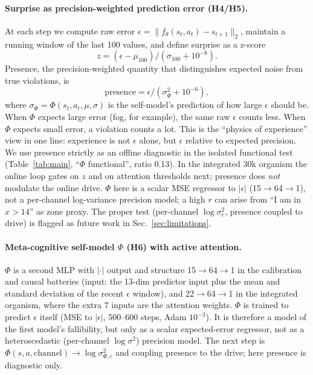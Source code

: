 \documentclass[11pt,a4paper]{article}
\begin{document}
\paragraph{Surprise as precision-weighted prediction error (H4/H5).} At each step we compute raw error $\epsilon = \|f_\theta(s_t,a_t) - s_{t+1}\|_2$, maintain a running window of the last 100 values, and define surprise as a z-score
\begin{equation}
z = (\epsilon - \mu_{100}) / (\sigma_{100}+10^{-8}).
\end{equation}
Presence, the precision-weighted quantity that distinguishes expected noise from true violations, is
\begin{equation}
\mathrm{presence} = \epsilon / (\sigma_\Phi^2 + 10^{-6}),
\end{equation}
where $\sigma_\Phi = \Phi(s_t, a_t, \mu, \sigma)$ is the self-model's prediction of how large $\epsilon$ should be. When $\Phi$ expects large error (fog, for example), the same raw $\epsilon$ counts less. When $\Phi$ expects small error, a violation counts a lot. This is the ``physics of experience'' view in one line: experience is not $\epsilon$ alone, but $\epsilon$ relative to expected precision. We use presence strictly as an offline diagnostic in the isolated functional test (Table~\ref{tab:main}, ``$\Phi$ functional'', ratio 0.13). In the integrated 30k organism the online loop gates on $z$ and on attention thresholds next; presence does \textit{not} modulate the online drive. $\Phi$ here is a scalar MSE regressor to $|\epsilon|$ (15$\rightarrow$64$\rightarrow$1), not a per-channel log-variance precision model; a high $r$ can arise from ``I am in $x>14$'' as zone proxy. The proper test (per-channel $\log \sigma^2_c$, presence coupled to drive) is flagged as future work in Sec.~\ref{sec:limitations}.

\paragraph{Meta-cognitive self-model $\Phi$ (H6) with active attention.} $\Phi$ is a second MLP with $|\cdot|$ output and structure 15$\rightarrow$64$\rightarrow$1 in the calibration and causal batteries (input: the 13-dim predictor input plus the mean and standard deviation of the recent $\epsilon$ window), and 22$\rightarrow$64$\rightarrow$1 in the integrated organism, where the extra 7 inputs are the attention weights. $\Phi$ is trained to predict $\epsilon$ itself (MSE to $|\epsilon|$, 500--600 steps, Adam $10^{-3}$). It is therefore a model of the first model's fallibility, but only as a scalar expected-error regressor, not as a heteroscedastic (per-channel $\log \sigma^2$) precision model. The next step is $\Phi(s,a,\mathrm{channel})\rightarrow \log \sigma^2_{\Phi,c}$ and coupling $\mathrm{presence}$ to the drive; here $\mathrm{presence}$ is diagnostic only.
\end{document}
